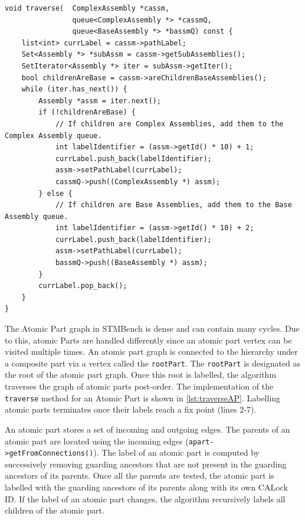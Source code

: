 \begin{lstlisting}[caption={Labelling a complex assembly.},label={lst:traverseCA}]
void traverse(  ComplexAssembly *cassm, 
                queue<ComplexAssembly *> *cassmQ, 
                queue<BaseAssembly *> *bassmQ) const {
    list<int> currLabel = cassm->pathLabel;
    Set<Assembly *> *subAssm = cassm->getSubAssemblies();
    SetIterator<Assembly *> iter = subAssm->getIter();
    bool childrenAreBase = cassm->areChildrenBaseAssemblies();
    while (iter.has_next()) {
        Assembly *assm = iter.next();
        if (!childrenAreBase) {
            // If children are Complex Assemblies, add them to the Complex Assembly queue.
            int labelIdentifier = (assm->getId() * 10) + 1;
            currLabel.push_back(labelIdentifier);
            assm->setPathLabel(currLabel);
            cassmQ->push((ComplexAssembly *) assm);
        } else {
            // If children are Base Assemblies, add them to the Base Assembly queue.
            int labelIdentifier = (assm->getId() * 10) + 2;
            currLabel.push_back(labelIdentifier);
            assm->setPathLabel(currLabel);
            bassmQ->push((BaseAssembly *) assm);
        }
        currLabel.pop_back();
    }
}
\end{lstlisting}



The Atomic Part graph in STMBench is dense and can contain many cycles. Due to this, atomic Parts are handled differently since an atomic part vertex can be visited multiple times. An atomic part graph is connected to the hierarchy under a composite part via a vertex called the \texttt{rootPart}. The \texttt{rootPart} is designated as the root of the atomic part graph. Once this root is labelled, the algorithm traverses the graph of atomic parts post-order. The implementation of the \texttt{traverse} method for an Atomic Part is shown in \cref{lst:traverseAP}. Labelling atomic parts terminates once their labels reach a fix point (lines 2-7). 

An atomic part stores a set of incoming and outgoing edges. The parents of an atomic part are located using the incoming edges (\texttt{apart->getFromConnections()}). The label of an atomic part is computed by successively removing guarding ancestors that are not present in the guarding ancestors of its parents. Once all the parents are tested, the atomic part is labelled with the guarding ancestors of its parents along with its own CALock ID. If the label of an atomic part changes, the algorithm recursively labels all children of the atomic part. 


